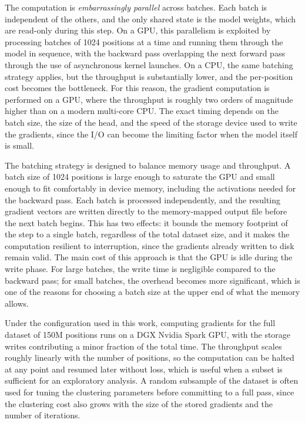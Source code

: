 The computation is \emph{embarrassingly parallel} across batches. Each batch is independent of the others, and the only shared state is the model weights, which are read-only during this step. On a GPU, this parallelism is exploited by processing batches of 1024 positions at a time and running them through the model in sequence, with the backward pass overlapping the next forward pass through the use of asynchronous kernel launches. On a CPU, the same batching strategy applies, but the throughput is substantially lower, and the per-position cost becomes the bottleneck. For this reason, the gradient computation is performed on a GPU, where the throughput is roughly two orders of magnitude higher than on a modern multi-core CPU. The exact timing depends on the batch size, the size of the head, and the speed of the storage device used to write the gradients, since the I/O can become the limiting factor when the model itself is small.

The batching strategy is designed to balance memory usage and throughput. A batch size of 1024 positions is large enough to saturate the GPU and small enough to fit comfortably in device memory, including the activations needed for the backward pass. Each batch is processed independently, and the resulting gradient vectors are written directly to the memory-mapped output file before the next batch begins. This has two effects: it bounds the memory footprint of the step to a single batch, regardless of the total dataset size, and it makes the computation resilient to interruption, since the gradients already written to disk remain valid. The main cost of this approach is that the GPU is idle during the write phase. For large batches, the write time is negligible compared to the backward pass; for small batches, the overhead becomes more significant, which is one of the reasons for choosing a batch size at the upper end of what the memory allows.

Under the configuration used in this work, computing gradients for the full dataset of 150M positions runs on a DGX Nvidia Spark GPU, with the storage writes contributing a minor fraction of the total time. The throughput scales roughly linearly with the number of positions, so the computation can be halted at any point and resumed later without loss, which is useful when a subset is sufficient for an exploratory analysis. A random subsample of the dataset is often used for tuning the clustering parameters before committing to a full pass, since the clustering cost also grows with the size of the stored gradients and the number of iterations.

